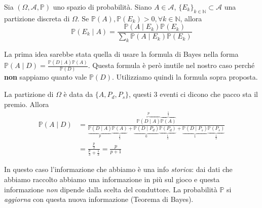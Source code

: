 \begin{enumerate}
\begin{theorem}
Sia $( \Omega ,\mathcal{A} ,\mathbb{P})$ uno spazio di probabilità. Siano $A\in \mathcal{A}$, $\{E_{k}\}_{k\in \mathbb{N}} \subset \mathcal{A}$ una partizione discreta di $\Omega $. Se $\mathbb{P}( A) ,\mathbb{P}( E_{k})  >0,\forall k\in \mathbb{N}$, allora
\begin{equation*}
\mathbb{P}( E_{k} \mid A) =\frac{\mathbb{P}( A\mid E_{k})\mathbb{P}( E_{k})}{\sum\nolimits _{k}\mathbb{P}( A\mid E_{k})\mathbb{P}( E_{k})}
\end{equation*}
\end{theorem}

\begin{oss}
La prima idea sarebbe stata quella di usare la formula di Bayes nella forma $\mathbb{P}( A\mid D) =\frac{\mathbb{P}( D\mid A)\mathbb{P}( A)}{\mathbb{P}( D)}$. Questa formula è però inutile nel nostro caso perché \textbf{non} sappiamo quanto vale $\mathbb{P}( D)$. Utilizziamo quindi la formula sopra proposta.
\end{oss}

La partizione di $\Omega $ è data da $\{A,P_{d} ,P_{s}\}$, questi $3$ eventi ci dicono che pacco sta il premio. Allora\begin{equation*}
\begin{aligned}
\mathbb{P}( A\mid D) & =\frac{\overbrace{\mathbb{P}( D\mid A)}^{p}\overbrace{\mathbb{P}( A)}^{\frac{1}{3}}}{\underbrace{\mathbb{P}( D\mid A)}_{p}\underbrace{\mathbb{P}( A)}_{\frac{1}{3}} +\underbrace{\mathbb{P}( D\mid P_{d})}_{0}\underbrace{\mathbb{P}( P_{d})}_{\frac{1}{3}} +\underbrace{\mathbb{P}( D\mid P_{s})}_{1}\underbrace{\mathbb{P}( P_{s})}_{\frac{1}{3}}}\\
 & =\frac{\frac{p}{3}}{\frac{p}{3} +\frac{1}{3}} =\frac{p}{p+1}
\end{aligned}
\end{equation*}

\begin{oss}
In questo caso l'informazione che abbiamo è una info \textit{storica}: dai dati che abbiamo raccolto abbiamo una informazione in più sul gioco e questa informazione \textit{non} dipende dalla scelta del conduttore. La probabilità $\mathbb{P}$ si \textit{aggiorna} con questa nuova informazione (Teorema di Bayes).
\end{oss}


\end{enumerate}
